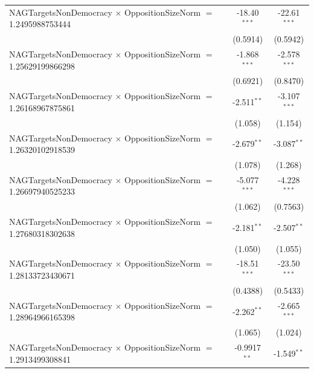 \begin{tabular}{lcc}
   NAGTargetsNonDemocracy $\times$ OppositionSizeNorm $=$ 1.2495988753444       & -18.40$^{***}$       & -22.61$^{***}$\\   
                                                                                & (0.5914)             & (0.5942)\\   
   NAGTargetsNonDemocracy $\times$ OppositionSizeNorm $=$ 1.25629199866298      & -1.868$^{***}$       & -2.578$^{***}$\\   
                                                                                & (0.6921)             & (0.8470)\\   
   NAGTargetsNonDemocracy $\times$ OppositionSizeNorm $=$ 1.26168967875861      & -2.511$^{**}$        & -3.107$^{***}$\\   
                                                                                & (1.058)              & (1.154)\\   
   NAGTargetsNonDemocracy $\times$ OppositionSizeNorm $=$ 1.26320102918539      & -2.679$^{**}$        & -3.087$^{**}$\\   
                                                                                & (1.078)              & (1.268)\\   
   NAGTargetsNonDemocracy $\times$ OppositionSizeNorm $=$ 1.26697940525233      & -5.077$^{***}$       & -4.228$^{***}$\\   
                                                                                & (1.062)              & (0.7563)\\   
   NAGTargetsNonDemocracy $\times$ OppositionSizeNorm $=$ 1.27680318302638      & -2.181$^{**}$        & -2.507$^{**}$\\   
                                                                                & (1.050)              & (1.055)\\   
   NAGTargetsNonDemocracy $\times$ OppositionSizeNorm $=$ 1.28133723430671      & -18.51$^{***}$       & -23.50$^{***}$\\   
                                                                                & (0.4388)             & (0.5433)\\   
   NAGTargetsNonDemocracy $\times$ OppositionSizeNorm $=$ 1.28964966165398      & -2.262$^{**}$        & -2.665$^{***}$\\   
                                                                                & (1.065)              & (1.024)\\   
   NAGTargetsNonDemocracy $\times$ OppositionSizeNorm $=$ 1.2913499308841       & -0.9917$^{**}$       & -1.549$^{**}$\\   

\end{tabular}
